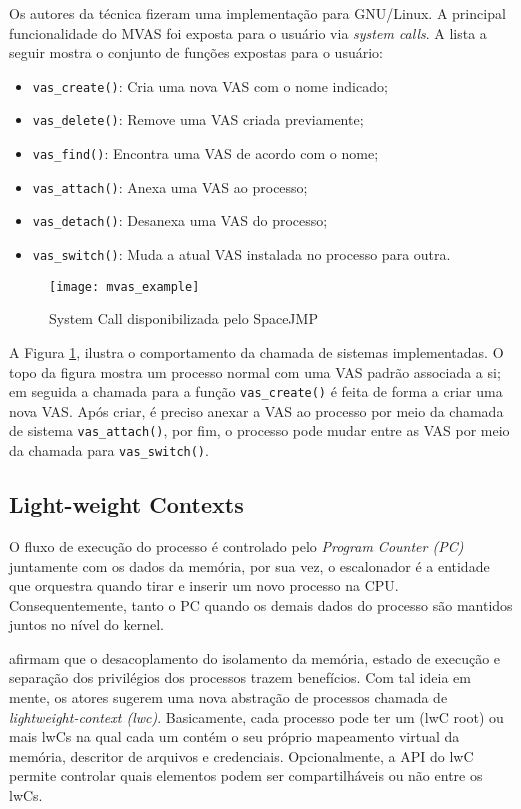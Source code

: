 Os autores da técnica fizeram uma implementação para GNU/Linux. A principal
funcionalidade do MVAS foi exposta para o usuário via \emph{system calls}. A
lista a seguir mostra o conjunto de funções expostas para o usuário:

\begin{itemize}
  \item \texttt{vas\_create()}: Cria uma nova VAS com o nome indicado;
  \item \texttt{vas\_delete()}: Remove uma VAS criada previamente;
  \item \texttt{vas\_find()}: Encontra uma VAS de acordo com o nome;
  \item \texttt{vas\_attach()}: Anexa uma VAS ao processo;
  \item \texttt{vas\_detach()}: Desanexa uma VAS do processo;
  \item \texttt{vas\_switch()}: Muda a atual VAS instalada no processo para outra.
\end{itemize}

\begin{figure}[!h]
  \centering
  \texttt{[image: mvas\_example]} 
  \caption{System Call disponibilizada pelo SpaceJMP \cite{ellarge}}
  \label{fig:mvas_example}
\end{figure}

A Figura \ref{fig:mvas_example}, ilustra o comportamento da chamada de sistemas
implementadas. O topo da figura mostra um processo normal com uma VAS padrão
associada a si; em seguida a chamada para a função \texttt{vas\_create()} é
feita de forma a criar uma nova VAS. Após criar, é preciso anexar a VAS ao
processo por meio da chamada de sistema \texttt{vas\_attach()}, por fim, o
processo pode mudar entre as VAS por meio da chamada para
\texttt{vas\_switch()}.

\subsection{Light-weight Contexts}
\label{sec:lwc}

O fluxo de execução do processo é controlado pelo \textit{Program Counter (PC)}
juntamente com os dados da memória, por sua vez, o escalonador é a entidade que
orquestra quando tirar e inserir um novo processo na CPU. Consequentemente,
tanto o PC quando os demais dados do processo são mantidos juntos no nível do
kernel.

\cite{litton} afirmam que o desacoplamento do isolamento da memória, estado de
execução e separação dos privilégios dos processos trazem benefícios. Com tal
ideia em mente, os atores sugerem uma nova abstração de processos chamada de
\textit{lightweight-context (lwc)}. Basicamente, cada processo pode ter um
(lwC root) ou mais lwCs na qual cada um contém o seu próprio mapeamento
virtual da memória, descritor de arquivos e credenciais. Opcionalmente, a API
do lwC permite controlar quais elementos podem ser compartilháveis ou não entre
os lwCs.


